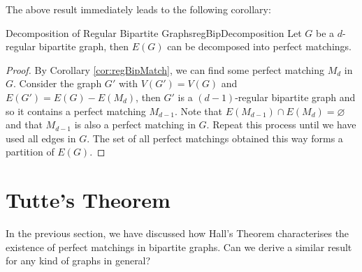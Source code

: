 \documentclass[math, code]{amznotes}
\theoremstyle{remark}
\begin{document}
The above result immediately leads to the following corollary:
\begin{corbox}{Decomposition of Regular Bipartite Graphs}{regBipDecomposition}
    Let $G$ be a $d$-regular bipartite graph, then $E(G)$ can be decomposed into perfect matchings.
    \tcblower
    \begin{proof}
        By Corollary \ref{cor:regBipMatch}, we can find some perfect matching $M_d$ in $G$. Consider the graph $G'$ with $V(G') = V(G)$ and $E(G') = E(G) - E(M_d)$, then $G'$ is a $(d - 1)$-regular bipartite graph and so it contains a perfect matching $M_{d - 1}$. Note that $E(M_{d - 1}) \cap E(M_d) = \varnothing$ and that $M_{d - 1}$ is also a perfect matching in $G$. Repeat this process until we have used all edges in $G$. The set of all perfect matchings obtained this way forms a partition of $E(G)$.
    \end{proof}
\end{corbox}
\section{Tutte's Theorem}
In the previous section, we have discussed how Hall's Theorem characterises the existence of perfect matchings in bipartite graphs. Can we derive a similar result for any kind of graphs in general?
\end{document}
